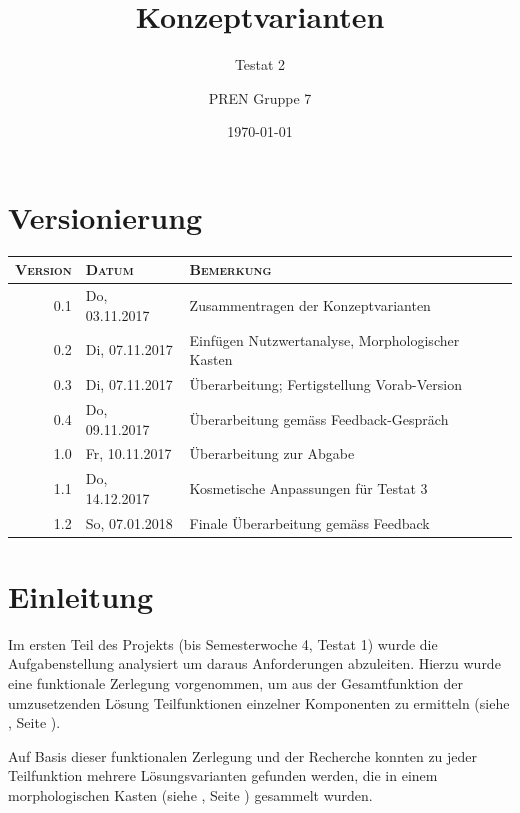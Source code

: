 \documentclass[a4paper,11pt]{scrartcl}
\begin{document}
\author{PREN Gruppe 7}
\title{Konzeptvarianten}
\subtitle{Testat 2}
\date{\today}

\maketitle

\section*{Versionierung}

\def\arraystretch{1.2}
\begin{tabularx}{\linewidth}{|r|l|X|}
\hline
\textsc{Version} & \textsc{Datum} & \textsc{Bemerkung} \\
\hline
0.1 & Do, 03.11.2017 & Zusammentragen der Konzeptvarianten \\
0.2 & Di, 07.11.2017 & Einfügen Nutzwertanalyse, Morphologischer Kasten \\
0.3 & Di, 07.11.2017 & Überarbeitung; Fertigstellung Vorab-Version \\
0.4 & Do, 09.11.2017 & Überarbeitung gemäss Feedback-Gespräch \\
1.0 & Fr, 10.11.2017 & Überarbeitung zur Abgabe \\
1.1 & Do, 14.12.2017 & Kosmetische Anpassungen für Testat 3 \\
1.2 & So, 07.01.2018 & Finale Überarbeitung gemäss Feedback \\
\hline
\end{tabularx}

\newpage

\tableofcontents

\newpage 

\section {Einleitung}

Im ersten Teil des Projekts (bis Semesterwoche 4, Testat 1) wurde die Aufgabenstellung analysiert um daraus Anforderungen abzuleiten. Hierzu wurde eine funktionale Zerlegung vorgenommen, um aus der Gesamtfunktion der umzusetzenden Lösung Teilfunktionen einzelner Komponenten zu ermitteln (siehe , Seite \pageref{lbl:FunktionalesBlockschaltbild}).

Auf Basis dieser funktionalen Zerlegung und der Recherche konnten zu jeder Teilfunktion mehrere Lösungsvarianten gefunden werden, die in einem morphologischen Kasten (siehe , Seite \pageref{lbl:MorphologischerKasten}) gesammelt wurden.
\end{document}

